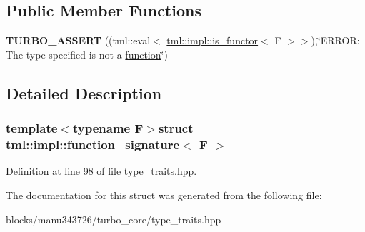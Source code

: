 \subsection*{Public Member Functions}
\begin{DoxyCompactItemize}
\item 
\hypertarget{structtml_1_1impl_1_1function__signature_addb12edd4ab0aaddd0633efe5863ce33}{{\bfseries T\+U\+R\+B\+O\+\_\+\+A\+S\+S\+E\+R\+T} ((tml\+::eval$<$ \hyperlink{structtml_1_1impl_1_1is__functor}{tml\+::impl\+::is\+\_\+functor}$<$ F $>$$>$),\char`\"{}E\+R\+R\+O\+R\+: The type specified is not a \hyperlink{structtml_1_1function}{function}\char`\"{})}\label{structtml_1_1impl_1_1function__signature_addb12edd4ab0aaddd0633efe5863ce33}

\end{DoxyCompactItemize}


\subsection{Detailed Description}
\subsubsection*{template$<$typename F$>$struct tml\+::impl\+::function\+\_\+signature$<$ F $>$}



Definition at line 98 of file type\+\_\+traits.\+hpp.



The documentation for this struct was generated from the following file\+:\begin{DoxyCompactItemize}
\item 
blocks/manu343726/turbo\+\_\+core/type\+\_\+traits.\+hpp\end{DoxyCompactItemize}
